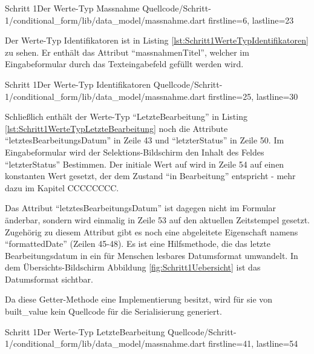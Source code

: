 \begin{alexlistingzwei}{Schritt 1}{Der Werte-Typ Massnahme}
  {Quellcode/Schritt-1/conditional_form/lib/data_model/massnahme.dart}
  {firstline=6, lastline=23}
  \label{lst:Schritt1WerteTypMassnahme}
\end{alexlistingzwei}

Der Werte-Typ Identifikatoren ist in Listing \ref{lst:Schritt1WerteTypIdentifikatoren} zu sehen.  Er enthält das Attribut \enquote{massnahmenTitel}, welcher im Eingabeformular durch das Texteingabefeld gefüllt werden wird.

\begin{alexlistingzwei}{Schritt 1}{Der Werte-Typ Identifikatoren}
  {Quellcode/Schritt-1/conditional_form/lib/data_model/massnahme.dart}
  {firstline=25, lastline=30}
  \label{lst:Schritt1WerteTypIdentifikatoren}
\end{alexlistingzwei}

Schließlich enthält der Werte-Typ \enquote{LetzteBearbeitung} in Listing \ref{lst:Schritt1WerteTypLetzteBearbeitung} noch die Attribute \enquote{letztesBearbeitungsDatum} in Zeile 43 und \enquote{letzterStatus} in Zeile 50. Im Eingabeformular wird der Selektions-Bildschirm den Inhalt des Feldes \enquote{letzterStatus} Bestimmen. Der initiale Wert auf wird in Zeile 54 auf einen konstanten Wert gesetzt, der dem Zustand \enquote{in Bearbeitung} entspricht - mehr dazu im Kapitel CCCCCCCC.

Das Attribut \enquote{letztesBearbeitungsDatum} ist dagegen nicht im Formular änderbar, sondern wird einmalig in Zeile 53 auf den aktuellen Zeitstempel gesetzt. Zugehörig zu diesem Attribut gibt es noch eine abgeleitete Eigenschaft namens \enquote{formattedDate} (Zeilen 45-48).  Es ist eine Hilfsmethode, die das letzte Bearbeitungsdatum in ein für Menschen lesbares Datumsformat umwandelt. In dem Übersichts-Bildschirm Abbildung \ref{fig:Schritt1Uebersicht} ist das Datumsformat sichtbar.

Da diese Getter-Methode eine Implementierung besitzt, wird für sie von built_value kein Quellcode für die Serialisierung generiert.



\begin{alexlistingzwei}{Schritt 1}{Der Werte-Typ LetzteBearbeitung}
  {Quellcode/Schritt-1/conditional_form/lib/data_model/massnahme.dart}
  {firstline=41, lastline=54}
  \label{lst:Schritt1WerteTypLetzteBearbeitung}
\end{alexlistingzwei}



